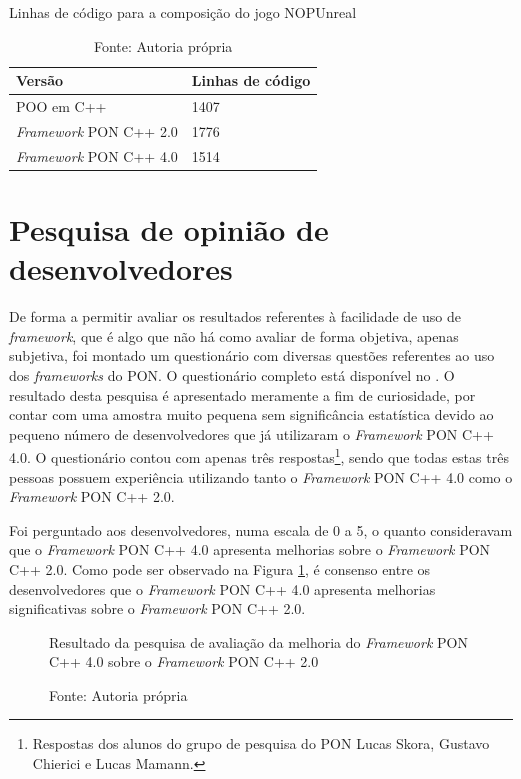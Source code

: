 \begin{table}[!htb]
\centering
\caption{Linhas de código para a composição do jogo NOPUnreal}
\caption*{Fonte: Autoria própria}
\label{tab:linhas_de_codigo_nopunreal}
\smallskip
\begin{tabularx}{0.8\textwidth}{|X|X|}
\hline
Versão & Linhas de código\\
\hline
POO em C++ & 1407 \\
\hline
\textit{Framework} PON C++ 2.0 & 1776 \\
\hline
\textit{Framework} PON C++ 4.0 & 1514 \\
\hline
\end{tabularx}
\end{table}

\section{Pesquisa de opinião de desenvolvedores}\label{sec:opiniao}

De forma a permitir avaliar os resultados referentes à facilidade de uso de
\textit{framework}, que é algo que não há como avaliar de forma objetiva, apenas
subjetiva, foi montado um questionário com diversas questões referentes ao uso
dos \textit{frameworks} do PON. O questionário completo está disponível no
. O resultado desta pesquisa é apresentado meramente a
fim de curiosidade, por contar com uma amostra muito pequena sem significância
estatística devido ao pequeno número de desenvolvedores que já utilizaram o
\textit{Framework} PON C++ 4.0. O questionário contou com apenas três
respostas\footnote{Respostas dos alunos do grupo de pesquisa do PON Lucas Skora,
Gustavo Chierici e Lucas Mamann.}, sendo que todas estas três pessoas possuem
experiência utilizando tanto o \textit{Framework} PON C++ 4.0 como o
\textit{Framework} PON C++ 2.0.

Foi perguntado aos desenvolvedores, numa escala de 0 a 5, o quanto consideravam
que o \textit{Framework} PON C++ 4.0 apresenta melhorias sobre o
\textit{Framework} PON C++ 2.0. Como pode ser observado na Figura
\ref{fig:fw_compare}, é consenso entre os desenvolvedores que o
\textit{Framework} PON C++ 4.0 apresenta melhorias significativas sobre o
\textit{Framework} PON C++ 2.0.

\begin{figure}[!htb]
\centering
{}
\caption{Resultado da pesquisa de avaliação da melhoria do \textit{Framework}
PON C++ 4.0 sobre o \textit{Framework} PON C++ 2.0}
\caption*{Fonte: Autoria própria}
\label{fig:fw_compare}
\end{figure}

